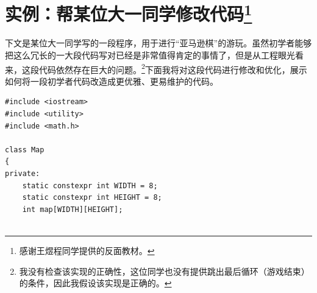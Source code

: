 \section[实例：帮某位大一同学修改代码]{实例：帮某位大一同学修改代码\protect\footnote{感谢王煜程同学提供的反面教材。}}

下文是某位大一同学写的一段程序，用于进行“亚马逊棋”的游玩。虽然初学者能够把这么冗长的一大段代码写对已经是非常值得肯定的事情了，但是从工程眼光看来，这段代码依然存在巨大的问题。\footnote{我没有检查该实现的正确性，这位同学也没有提供跳出最后循环（游戏结束）的条件，因此我假设该实现是正确的。}下面我将对这段代码进行修改和优化，展示如何将一段初学者代码改造成更优雅、更易维护的代码。
\begin{verbatim}
#include <iostream>
#include <utility>
#include <math.h>

class Map
{
private:
    static constexpr int WIDTH = 8;
    static constexpr int HEIGHT = 8;
    int map[WIDTH][HEIGHT];


\end{verbatim}
